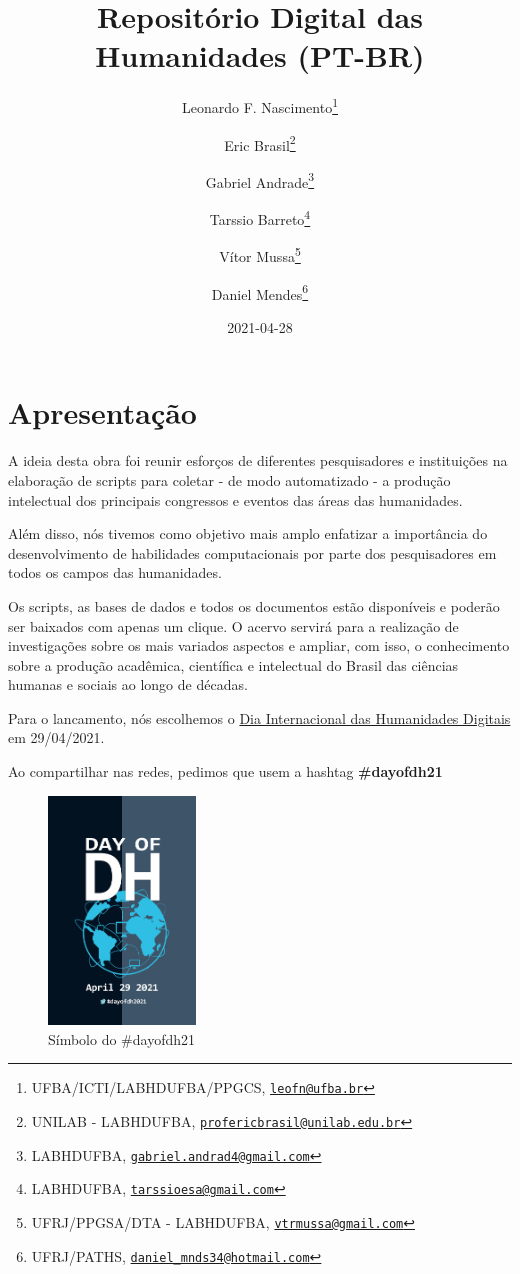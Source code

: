 \documentclass[
]{book}
\title{Repositório Digital das Humanidades (PT-BR)}
\author{Leonardo F. Nascimento\footnote{UFBA/ICTI/LABHDUFBA/PPGCS, \href{mailto:leofn@ufba.br}{\nolinkurl{leofn@ufba.br}}} \and Eric Brasil\footnote{UNILAB - LABHDUFBA, \href{mailto:profericbrasil@unilab.edu.br}{\nolinkurl{profericbrasil@unilab.edu.br}}} \and Gabriel Andrade\footnote{LABHDUFBA, \href{mailto:gabriel.andrad4@gmail.com}{\nolinkurl{gabriel.andrad4@gmail.com}}} \and Tarssio Barreto\footnote{LABHDUFBA, \href{mailto:tarssioesa@gmail.com}{\nolinkurl{tarssioesa@gmail.com}}} \and Vítor Mussa\footnote{UFRJ/PPGSA/DTA - LABHDUFBA, \href{mailto:vtrmussa@gmail.com}{\nolinkurl{vtrmussa@gmail.com}}} \and Daniel Mendes\footnote{UFRJ/PATHS, \href{mailto:daniel_mnds34@hotmail.com}{\nolinkurl{daniel\_mnds34@hotmail.com}}}}
\date{2021-04-28}
\begin{document}
\maketitle

{
\setcounter{tocdepth}{1}
\tableofcontents
}
\hypertarget{apresentauxe7uxe3o}{%
\chapter{Apresentação}\label{apresentauxe7uxe3o}}

A ideia desta obra foi reunir esforços de diferentes pesquisadores e instituições na elaboração de scripts para coletar - de modo automatizado - a produção intelectual dos principais congressos e eventos das áreas das humanidades.

Além disso, nós tivemos como objetivo mais amplo enfatizar a importância do desenvolvimento de habilidades computacionais por parte dos pesquisadores em todos os campos das humanidades.

Os scripts, as bases de dados e todos os documentos estão disponíveis e poderão ser baixados com apenas um clique. O acervo servirá para a realização de investigações sobre os mais variados aspectos e ampliar, com isso, o conhecimento sobre a produção acadêmica, científica e intelectual do Brasil das ciências humanas e sociais ao longo de décadas.

Para o lancamento, nós escolhemos o \href{https://dhcenternet.org/initiatives/day-of-dh/2021}{Dia Internacional das Humanidades Digitais} em 29/04/2021.

Ao compartilhar nas redes, pedimos que usem a hashtag \textbf{\#dayofdh21}

\begin{figure}
\centering
\includegraphics[width=0.35\textwidth,height=\textheight]{./img/dayofdh.jpg}
\caption{Símbolo do \#dayofdh21}
\end{figure}
\end{document}
